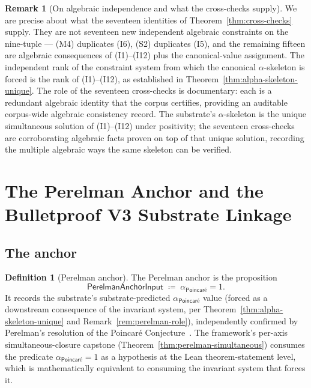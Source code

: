 \documentclass[11pt,a4paper]{amsart}
\theoremstyle{plain}
\theoremstyle{definition}
\newtheorem{definition}[theorem]{Definition}
\newtheorem{remark}[theorem]{Remark}
\begin{document}
\begin{remark}[On algebraic independence and what the cross-checks supply]\label{rem:cross-checks-role}
We are precise about what the seventeen identities of Theorem~\ref{thm:cross-checks} supply. They are not seventeen new independent algebraic constraints on the nine-tuple --- (M4) duplicates (I6), (S2) duplicates (I5), and the remaining fifteen are algebraic consequences of (I1)--(I12) plus the canonical-value assignment. The independent rank of the constraint system from which the canonical $\alpha$-skeleton is forced is the rank of (I1)--(I12), as established in Theorem~\ref{thm:alpha-skeleton-unique}. The role of the seventeen cross-checks is documentary: each is a redundant algebraic identity that the corpus certifies, providing an auditable corpus-wide algebraic consistency record. The substrate's $\alpha$-skeleton is the unique simultaneous solution of (I1)--(I12) under positivity; the seventeen cross-checks are corroborating algebraic facts proven on top of that unique solution, recording the multiple algebraic ways the same skeleton can be verified.
\end{remark}

\section{The Perelman Anchor and the Bulletproof V3 Substrate Linkage}\label{sec:perelman-anchor}

\subsection{The anchor}

\begin{definition}[Perelman anchor]\label{def:perelman-anchor}
The Perelman anchor is the proposition
\[
\textsf{PerelmanAnchorInput} \;\coloneqq\; \alpha_{\textsf{Poincar\'e}} = 1.
\]
It records the substrate's substrate-predicted $\alpha_{\textsf{Poincar\'e}}$ value (forced as a downstream consequence of the invariant system, per Theorem~\ref{thm:alpha-skeleton-unique} and Remark~\ref{rem:perelman-role}), independently confirmed by Perelman's resolution of the Poincar\'e Conjecture~\cite{perelman2003}. The framework's per-axis simultaneous-closure capstone (Theorem~\ref{thm:perelman-simultaneous}) consumes the predicate $\alpha_{\textsf{Poincar\'e}}=1$ as a hypothesis at the Lean theorem-statement level, which is mathematically equivalent to consuming the invariant system that forces it.
\end{definition}
\end{document}
